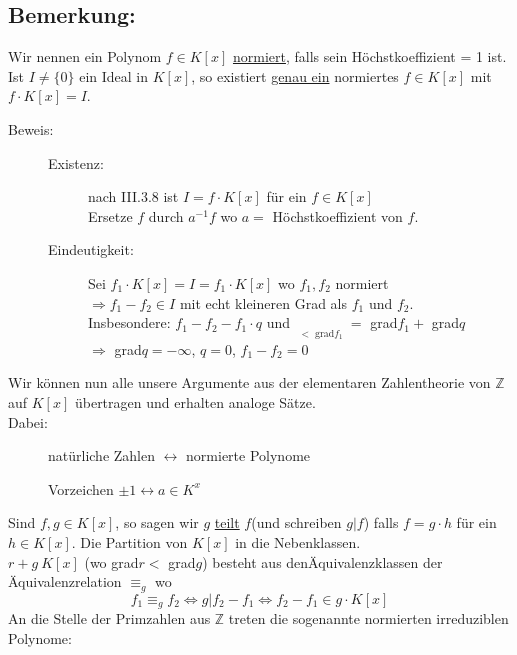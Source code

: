\subsection{Bemerkung:}
Wir nennen ein Polynom $f \in K[x]$ \underline{normiert}, falls sein Höchstkoeffizient = 1 ist. Ist $ I \neq \{0\}$ ein Ideal in $K[x]$, so existiert \underline{genau ein} normiertes $f \in K[x]$ mit $f \cdot K[x] = I$. 
\begin{description}
	\item[Beweis:] \quad
	\begin{description}
		\item[Existenz:] nach III.3.8 ist $I=f \cdot K[x]$ für ein $f \in K[x]$\\
					Ersetze $f$ durch $a^{-1}f$ wo $a=$ Höchstkoeffizient von $f$.
		\item[Eindeutigkeit:] Sei $f_{1} \cdot K[x]=I=f_{1} \cdot K[x]$ wo $f_{1}, f_{2}$ normiert\\
					$\Rightarrow f_{1}-f_{2} \in I$ mit echt kleineren Grad als $f_{1}$ und $f_{2}$. \\
					Insbesondere: $f_{1}-f_{2}-f_{1} \cdot q$ und $\mathop{\underbrace{\text{grad}(f_{1}-
					f_{2})}}\limits_{<\text{ grad}f_{1}} =$ grad$f_{1} +$ grad$q$\\
					$\Rightarrow$ grad$q = -\infty$, $q=0$, $f_{1}-f_{2}=0$
	\end{description}
\end{description}
Wir können nun alle unsere Argumente aus der elementaren Zahlentheorie von $\mathbb{Z}$ auf $K[x]$ übertragen und erhalten analoge Sätze.\\
Dabei:
\begin{description}
	\item[] natürliche Zahlen $\leftrightarrow$ normierte Polynome
	\item[] Vorzeichen $\pm 1 \leftrightarrow a \in K^{x}$
\end{description}
Sind $f,g \in K[x]$, so sagen wir $g$ \underline{teilt} $f$(und schreiben $g|f$) falls $f=g \cdot h$ für ein $h \in K[x]$. Die Partition von $K[x]$ in die Nebenklassen.\\
$r+g \ K[x]$ (wo grad$r <$ grad$g$) besteht aus denÄquivalenzklassen der Äquivalenzrelation $\equiv_{g}$ wo
\begin{equation*}
	f_{1} \equiv_{g} f_{2} \Leftrightarrow g|f_{2}-f_{1} \Leftrightarrow f_{2}-f_{1} \in g \cdot K[x]
\end{equation*}
An die Stelle der Primzahlen aus $\mathbb{Z}$ treten die sogenannte normierten irreduziblen Polynome:
%
%
%
